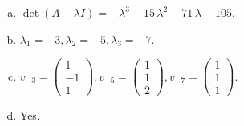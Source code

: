 \begin{questions}
\begin{solution}
\begin{enumerate}[(a)]
\item $\det(A-\lambda I)=-{\lambda}^{3} - 15 \, {\lambda}^{2} - 71 \, {\lambda} - 105$.
\item ${\lambda}_1=-3, {\lambda}_2=-5, {\lambda}_3=-7$.
\item $v_{-3}=\left(\begin{array}{r}
1 \\
-1 \\
1
\end{array}\right), v_{-5}=\left(\begin{array}{r}
1 \\
1 \\
2
\end{array}\right), v_{-7}=\left(\begin{array}{r}
1 \\
1 \\
1
\end{array}\right)$.
\item Yes.
\end{enumerate}
\end{solution}

\end{questions}

\newpage


\begin{center}
\end{center}

